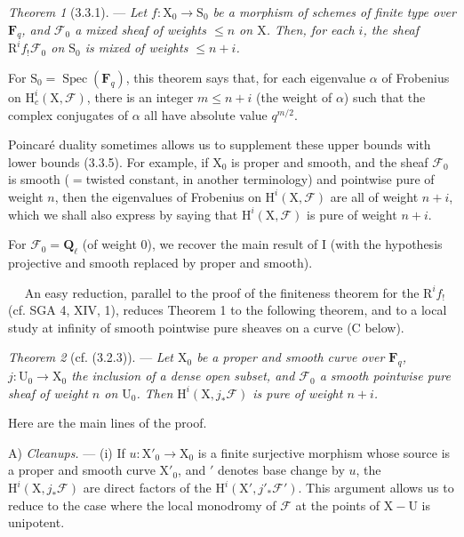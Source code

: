 \documentclass[11pt,leqno]{article}
\newcommand{\Page}[1]{\ifvmode\noindent\else\unskip\ \fi{\footnotesize\textcolor{gray}{[p.\,#1]}}\ \ignorespaces}
\begin{document}
\textit{Theorem 1} (3.3.1). — \textit{Let \(f:\mathrm{X}_0\to\mathrm{S}_0\) be a morphism of schemes of finite type over \(\mathbf{F}_q\), and \(\mathscr{F}_0\) a mixed sheaf of weights \(\leq n\) on \(\mathrm{X}\). Then, for each \(i\), the sheaf \(\mathrm{R}^i f_!\mathscr{F}_0\) on \(\mathrm{S}_0\) is mixed of weights \(\leq n+i\).}

For \(\mathrm{S}_0=\operatorname{Spec}(\mathbf{F}_q)\), this theorem says that, for each eigenvalue \(\alpha\) of Frobenius on \(\mathrm{H}_c^i(\mathrm{X},\mathscr{F})\), there is an integer \(m\leq n+i\) (the weight of \(\alpha\)) such that the complex conjugates of \(\alpha\) all have absolute value \(q^{m/2}\).

Poincaré duality sometimes allows us to supplement these upper bounds with lower bounds (3.3.5). For example, if \(\mathrm{X}_0\) is proper and smooth, and the sheaf \(\mathscr{F}_0\) is smooth (\(=\)twisted constant, in another terminology) and pointwise pure of weight \(n\), then the eigenvalues of Frobenius on \(\mathrm{H}^i(\mathrm{X},\mathscr{F})\) are all of weight \(n+i\), which we shall also express by saying that \(\mathrm{H}^i(\mathrm{X},\mathscr{F})\) is pure of weight \(n+i\).

For \(\mathscr{F}_0=\mathbf{Q}_\ell\) (of weight 0), we recover the main result of I (with the hypothesis projective and smooth replaced by proper and smooth).

\Page{139}
An easy reduction, parallel to the proof of the finiteness theorem for the \(\mathrm{R}^i f_!\) (cf. SGA 4, XIV, 1), reduces Theorem 1 to the following theorem, and to a local study at infinity of smooth pointwise pure sheaves on a curve (C below).

\textit{Theorem 2} (cf. (3.2.3)). — \textit{Let \(\mathrm{X}_0\) be a proper and smooth curve over \(\mathbf{F}_q\), \(j:\mathrm{U}_0\to\mathrm{X}_0\) the inclusion of a dense open subset, and \(\mathscr{F}_0\) a smooth pointwise pure sheaf of weight \(n\) on \(\mathrm{U}_0\). Then \(\mathrm{H}^i(\mathrm{X},j_*\mathscr{F})\) is pure of weight \(n+i\).}

Here are the main lines of the proof.

A) \textit{Cleanups.} — (i) If \(u:\mathrm{X}'_0\to\mathrm{X}_0\) is a finite surjective morphism whose source is a proper and smooth curve \(\mathrm{X}'_0\), and \({}'\) denotes base change by \(u\), the \(\mathrm{H}^i(\mathrm{X},j_*\mathscr{F})\) are direct factors of the \(\mathrm{H}^i(\mathrm{X}',j'_*\mathscr{F}')\). This argument allows us to reduce to the case where the local monodromy of \(\mathscr{F}\) at the points of \(\mathrm{X}-\mathrm{U}\) is unipotent.
\end{document}
